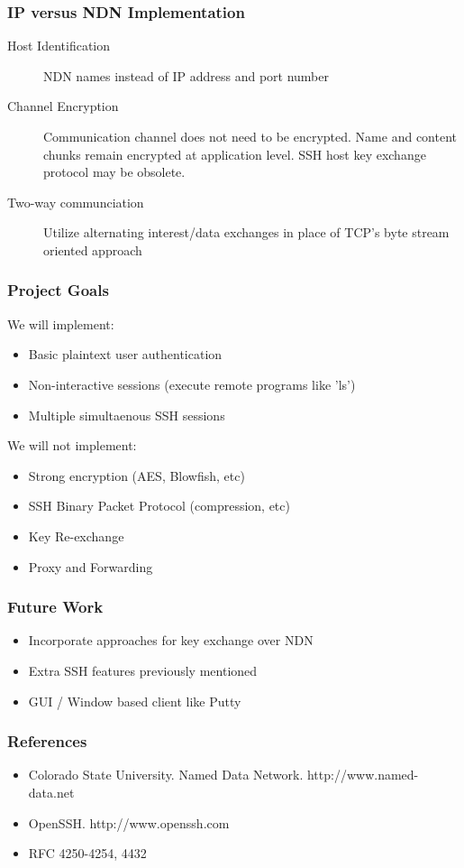 \documentclass[14pt]{beamer}
\begin{document}
\begin{frame}
    \frametitle{IP versus NDN Implementation}
    \begin{description}
        \item[Host Identification] NDN names instead of IP address and port number
        \item[Channel Encryption] Communication channel does not need to be encrypted. Name and content chunks remain encrypted at application level. SSH host key exchange protocol may be obsolete.
        \item[Two-way communciation] Utilize alternating interest/data exchanges in place of TCP's byte stream oriented approach
    \end{description}
\end{frame}

\begin{frame}
    \frametitle{Project Goals}
    We will implement:
    \begin{itemize}
        \item Basic plaintext user authentication
        \item Non-interactive sessions (execute remote programs like 'ls')
        \item Multiple simultaenous SSH sessions
    \end{itemize}

    We will not implement:
    \begin{itemize}
        \item Strong encryption (AES, Blowfish, etc)
        \item SSH Binary Packet Protocol (compression, etc)
        \item Key Re-exchange
        \item Proxy and Forwarding
    \end{itemize}
\end{frame}

\begin{frame}
    \frametitle{Future Work}
    \begin{itemize}
        \item Incorporate approaches for key exchange over NDN
        \item Extra SSH features previously mentioned
        \item GUI / Window based client like Putty
    \end{itemize}
\end{frame}

\begin{frame}
    \frametitle{References}
    \begin{itemize}
        \item Colorado State University. Named Data Network. http://www.named-data.net
        \item OpenSSH. http://www.openssh.com
        \item RFC 4250-4254, 4432
    \end{itemize}
\end{frame}
\end{document}
